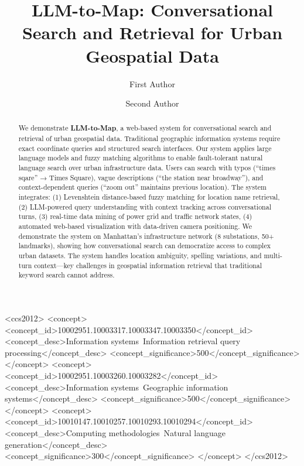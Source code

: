 \documentclass[sigconf]{acmart}
\begin{document}
\title{LLM-to-Map: Conversational Search and Retrieval for Urban Geospatial Data}

\author{First Author}

\author{Second Author}

\renewcommand{\shortauthors}{Author et al.}


\begin{abstract}
We demonstrate \textbf{LLM-to-Map}, a web-based system for conversational search and retrieval of urban geospatial data. Traditional geographic information systems require exact coordinate queries and structured search interfaces. Our system applies large language models and fuzzy matching algorithms to enable fault-tolerant natural language search over urban infrastructure data. Users can search with typos (``times sqare'' → Times Square), vague descriptions (``the station near broadway''), and context-dependent queries (``zoom out'' maintains previous location). The system integrates: (1) Levenshtein distance-based fuzzy matching for location name retrieval, (2) LLM-powered query understanding with context tracking across conversational turns, (3) real-time data mining of power grid and traffic network states, (4) automated web-based visualization with data-driven camera positioning. We demonstrate the system on Manhattan's infrastructure network (8 substations, 50+ landmarks), showing how conversational search can democratize access to complex urban datasets. The system handles location ambiguity, spelling variations, and multi-turn context—key challenges in geospatial information retrieval that traditional keyword search cannot address.
\end{abstract}

\begin{CCSXML}
<ccs2012>
<concept>
<concept_id>10002951.10003317.10003347.10003350</concept_id>
<concept_desc>Information systems~Information retrieval query processing</concept_desc>
<concept_significance>500</concept_significance>
</concept>
<concept>
<concept_id>10002951.10003260.10003282</concept_id>
<concept_desc>Information systems~Geographic information systems</concept_desc>
<concept_significance>500</concept_significance>
</concept>
<concept>
<concept_id>10010147.10010257.10010293.10010294</concept_id>
<concept_desc>Computing methodologies~Natural language generation</concept_desc>
<concept_significance>300</concept_significance>
</concept>
</ccs2012>
\end{CCSXML}
\end{document}
